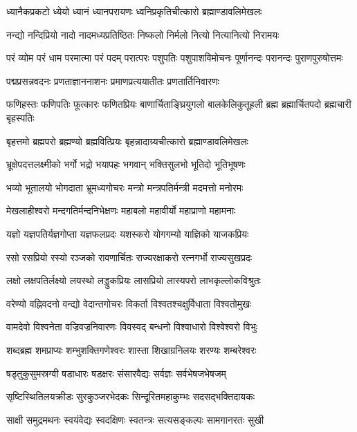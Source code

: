 \twolineshloka
{ध्यानैकप्रकटो ध्येयो ध्यानं ध्यानपरायणः}
{ध्वनिप्रकृतिचीत्कारो ब्रह्माण्डावलिमेखलः}%

\twolineshloka
{नन्द्यो नन्दिप्रियो नादो नादमध्यप्रतिष्ठितः}
{निष्कलो निर्मलो नित्यो नित्यानित्यो निरामयः}%

\threelineshloka
{परं व्योम परं धाम परमात्मा परं पदम्}
{परात्परः पशुपतिः पशुपाशविमोचनः}
{पूर्णानन्दः परानन्दः पुराणपुरुषोत्तमः}%

\twolineshloka
{पद्मप्रसन्नवदनः प्रणताज्ञाननाशनः}
{प्रमाणप्रत्ययातीतः प्रणतार्तिनिवारणः}%

\threelineshloka
{फणिहस्तः फणिपतिः फूत्कारः फणितप्रियः}
{बाणार्चिताङ्घ्रियुगलो बालकेलिकुतूहली}
{ब्रह्म ब्रह्मार्चितपदो ब्रह्मचारी बृहस्पतिः}%

\twolineshloka
{बृहत्तमो ब्रह्मपरो ब्रह्मण्यो ब्रह्मवित्प्रियः}
{बृहन्नादाग्र्यचीत्कारो ब्रह्माण्डावलिमेखलः}%

\twolineshloka
{भ्रूक्षेपदत्तलक्ष्मीको भर्गो भद्रो भयापहः}
{भगवान् भक्तिसुलभो भूतिदो भूतिभूषणः}%

\twolineshloka
{भव्यो भूतालयो भोगदाता भ्रूमध्यगोचरः}
{मन्त्रो मन्त्रपतिर्मन्त्री मदमत्तो मनोरमः}%

\twolineshloka
{मेखलाहीश्वरो मन्दगतिर्मन्दनिभेक्षणः}
{महाबलो महावीर्यो महाप्राणो महामनाः}%

\twolineshloka
{यज्ञो यज्ञपतिर्यज्ञगोप्ता यज्ञफलप्रदः}
{यशस्करो योगगम्यो याज्ञिको याजकप्रियः}%

\twolineshloka
{रसो रसप्रियो रस्यो रञ्जको रावणार्चितः}
{राज्यरक्षाकरो रत्नगर्भो राज्यसुखप्रदः}%

\twolineshloka
{लक्षो लक्षपतिर्लक्ष्यो लयस्थो लड्डुकप्रियः}
{लासप्रियो लास्यपरो लाभकृल्लोकविश्रुतः}%

\twolineshloka
{वरेण्यो वह्निवदनो वन्द्यो वेदान्तगोचरः}
{विकर्ता विश्वतश्चक्षुर्विधाता विश्वतोमुखः}%

\twolineshloka
{वामदेवो विश्वनेता वज्रिवज्रनिवारणः}
{विवस्वद् बन्धनो विश्वाधारो विश्वेश्वरो विभुः}%

\twolineshloka
{शब्दब्रह्म शमप्राप्यः शम्भुशक्तिगणेश्वरः}
{शास्ता शिखाग्रनिलयः शरण्यः शम्बरेश्वरः}%

\twolineshloka
{षडृतुकुसुमस्रग्वी षडाधारः षडक्षरः}
{संसारवैद्यः सर्वज्ञः सर्वभेषजभेषजम्}%

\twolineshloka
{सृष्टिस्थितिलयक्रीडः सुरकुञ्जरभेदकः}
{सिन्दूरितमहाकुम्भः सदसद्भक्तिदायकः}%

\twolineshloka
{साक्षी समुद्रमथनः स्वयंवेद्यः स्वदक्षिणः}
{स्वतन्त्रः सत्यसङ्कल्पः सामगानरतः सुखी}%


